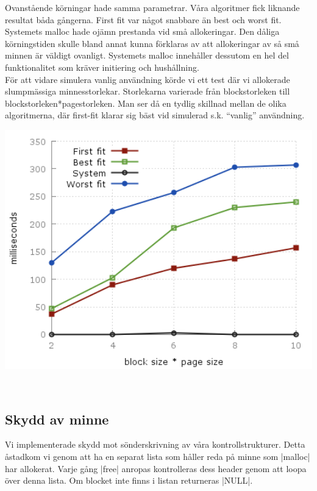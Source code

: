 \documentclass[paper=a4, fontsize=11pt]{scrartcl} %
\numberwithin{equation}{section} %
\numberwithin{figure}{section} %
\numberwithin{table}{section} %
\begin{document}
Ovanstående körningar hade samma parametrar.
Våra algoritmer fick liknande resultat båda gångerna.
First fit var något snabbare än best och worst fit.
Systemets malloc hade ojämn prestanda vid små allokeringar. 
Den dåliga körningstiden skulle bland annat kunna förklaras av att allokeringar
av så små minnen är väldigt ovanligt.
Systemets malloc innehåller dessutom en hel del funktionalitet som kräver
initiering och hushållning.\\


För att vidare simulera vanlig användning körde vi ett test där vi allokerade
slumpmässiga minnesstorlekar.
Storlekarna varierade från blockstorleken till blockstorleken*pagestorleken.
Man ser då en tydlig skillnad mellan de olika algoritmerna, där first-fit
klarar sig bäst vid simulerad s.k. ``vanlig'' användning.

\begin{minipage}{.5\textwidth}
    \centering
    \includegraphics[width=1\textwidth]{images/time_plot_rand.png}
    \label{fig:p3}
\end{minipage}\\



\subsection{Skydd av minne}

Vi implementerade skydd mot sönderskrivning av våra kontrollstrukturer. 
Detta åstadkom vi genom att ha en separat lista som håller reda på minne som
|malloc| har allokerat.
Varje gång |free| anropas kontrolleras dess header genom att loopa över denna
lista.
Om blocket inte finns i listan returneras |NULL|.
\end{document}
